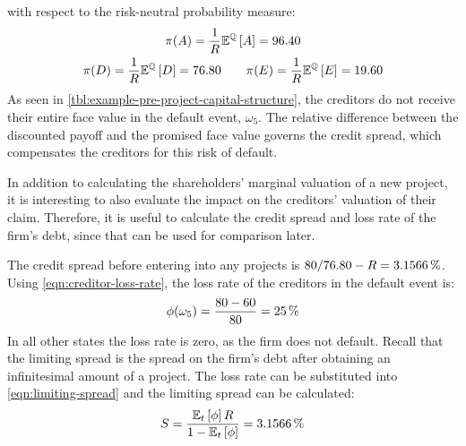 \documentclass[main.tex]{subfiles}
\begin{document}
    with respect to the risk-neutral probability measure:
        \begin{gather*}
            \pi(A) = \frac{1}{R} \mathbb{E}^{\mathbb{Q}}\left[A\right] = \num{96.40} \\
            \pi(D) = \frac{1}{R} \mathbb{E}^{\mathbb{Q}}\left[D\right] = \num{76.80}
            \qquad \pi(E) = \frac{1}{R} \mathbb{E}^{\mathbb{Q}}\left[E\right] = \num{19.60}
        \end{gather*}
    As seen in \cref{tbl:example-pre-project-capital-structure},
    the creditors do not receive their entire face value in the default event, $\omega_5$.
    The relative difference between the discounted payoff and the promised face value
    governs the credit spread, which compensates the creditors for this risk of default.

    In addition to calculating the shareholders' marginal valuation of a new project,
    it is interesting to also evaluate the impact on the creditors' valuation of their claim. 
    Therefore, it is useful to calculate the credit spread and loss rate of the firm's debt,
    since that can be used for comparison later.

    The credit spread before entering into any projects is 
    $\num{80}/\num{76.80} - \grossrfrate = \pct{0.031566}$.
    Using \cref{eqn:creditor-loss-rate}, the loss rate of the creditors in the default event is:
        \begin{equation*}
            \phi(\omega_{5}) 
            = 
                \frac{
                    \num{80}-\num{60}
                }{
                    \num{80}
                } 
            = 
                \pct{0.25}
        \end{equation*}
    In all other states the loss rate is zero, as the firm does not default.
    Recall that the limiting spread is the spread on the firm's debt 
    after obtaining an infinitesimal amount of a project. 
    The loss rate can be substituted into \cref{eqn:limiting-spread} 
    and the limiting spread can be calculated:
        \begin{equation*}
            S
            =
            \frac{
                \mathbb{E}_{t}\left[\phi\right]
                R
            }{
                1 
                -
                \mathbb{E}_{t}\left[\phi\right] 
            } 
            =
            \pct{0.031566}
        \end{equation*}
\end{document}
